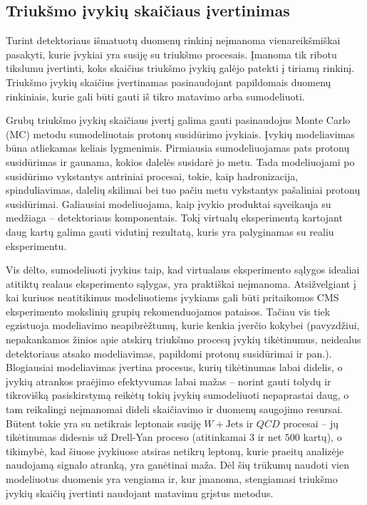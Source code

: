 \documentclass[a4paper, 12pt, oneside]{article}
\newcommand{\WJets}{W\! +\!\mathrm{Jets}}
\newcommand{\QCD}{QC\! D}
\begin{document}
\subsection{Triukšmo įvykių skaičiaus įvertinimas}
Turint detektoriaus išmatuotų duomenų rinkinį neįmanoma vienareikšmiškai pasakyti, kurie įvykiai yra susiję su triukšmo
procesais.
Įmanoma tik ribotu tikslumu įvertinti, koks skaičius triukšmo įvykių galėjo patekti į tiriamą rinkinį.
Triukšmo įvykių skaičius įvertinamas pasinaudojant papildomais duomenų rinkiniais, kurie gali būti gauti iš tikro matavimo
arba sumodeliuoti.

Grubų triukšmo įvykių skaičiaus įvertį galima gauti pasinaudojus Monte Carlo (MC) metodu sumodeliuotais protonų susidūrimo įvykiais.
Įvykių modeliavimas būna atliekamas keliais lygmenimis.
Pirmiausia sumodeliuojamas pats protonų susidūrimas ir gaunama, kokios dalelės susidarė jo metu.
Tada modeliuojami po susidūrimo vykstantys antriniai procesai, tokie, kaip hadronizacija, spinduliavimas, dalelių skilimai bei
tuo pačiu metu vykstantys pašaliniai protonų susidūrimai.
Galiausiai modeliuojama, kaip įvykio produktai sąveikauja su medžiaga -- detektoriaus komponentais.
Tokį virtualų eksperimentą kartojant daug kartų galima gauti vidutinį rezultatą, kuris yra palyginamas su realiu eksperimentu.

Vis dėlto, sumodeliuoti įvykius taip, kad virtualaus eksperimento sąlygos idealiai atitiktų realaus eksperimento sąlygas,
yra praktiškai neįmanoma.
Atsižvelgiant į kai kuriuos neatitikimus modeliuotiems įvykiams gali būti pritaikomos CMS eksperimento mokslinių grupių
rekomenduojamos pataisos.
Tačiau vis tiek egzistuoja modeliavimo neapibrėžtumų, kurie kenkia įverčio kokybei (pavyzdžiui, nepakankamos žinios apie
atskirų triukšmo procesų įvykių tikėtinumus, neidealus detektoriaus atsako modeliavimas, papildomi protonų susidūrimai ir pan.).
Blogiausiai modeliavimas įvertina procesus, kurių tikėtinumas labai didelis, o įvykių atrankos praėjimo efektyvumas labai
mažas -- norint gauti tolydų ir tikrovišką pasiskirstymą reikėtų tokių įvykių sumodeliuoti nepaprastai daug, o tam
reikalingi neįmanomai dideli skaičiavimo ir duomenų saugojimo resursai.
Būtent tokie yra su netikrais leptonais susiję $\WJets$ ir $\QCD$ procesai -- jų tikėtinumas didesnis už
Drell-Yan proceso (atitinkamai $3$ ir net $500$ kartų), o tikimybė, kad šiuose įvykiuose atsiras netikrų leptonų, kurie
praeitų analizėje naudojamą signalo atranką, yra ganėtinai maža. 
Dėl šių trūkumų naudoti vien modeliuotus duomenis yra vengiama ir, kur įmanoma, stengiamasi triukšmo įvykių skaičių
įvertinti naudojant matavimu grįstus metodus.
\end{document}
